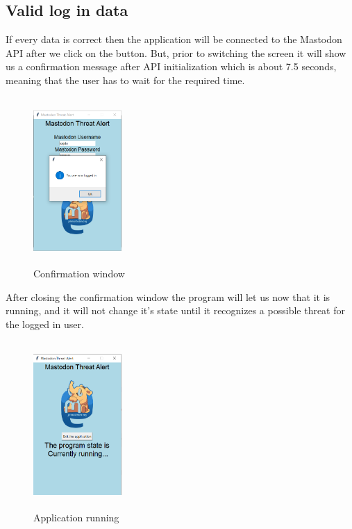 \subsection{Valid log in data}
\label{ss:correct_data}
If every data is correct then the application will be connected to the Mastodon API after
we click on the button. But, prior to switching the screen it will show us a confirmation
message after API initialization which is about 7.5 seconds, meaning that the user has to wait for the required time.
\begin{figure}[H]
	\centering
	\includegraphics[width=0.3\textwidth,height=240px]{images/confimlogin.png}
	\caption{Confirmation window}
	\label{fig:confirm_logn}
\end{figure}
After closing the confirmation window 
the program will let us now that it is running, and it will not
change it's state until it recognizes a possible threat for the logged in user.
\begin{figure}[H]
	\centering
	\includegraphics[width=0.3\textwidth,height=240px]{images/runningapp.png}
	\caption{Application running}
	\label{fig:running_app}
\end{figure}

